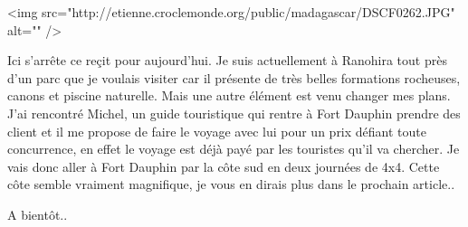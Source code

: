 <img src="http://etienne.croclemonde.org/public/madagascar/DSCF0262.JPG" alt="" />

Ici s'arrête ce reçit pour aujourd'hui. Je suis actuellement à Ranohira tout près d'un parc que je voulais visiter car il présente de très belles formations rocheuses, canons et piscine naturelle. Mais une autre élément est venu changer mes plans. J'ai rencontré Michel, un guide touristique qui rentre à Fort Dauphin prendre des client et il me propose de faire le voyage avec lui pour un prix défiant toute concurrence, en effet le voyage est déjà payé par les touristes qu'il va chercher. Je vais donc aller à Fort Dauphin par la côte sud en deux journées de 4x4. Cette côte semble vraiment magnifique, je vous en dirais plus dans le prochain article..

A bientôt..
